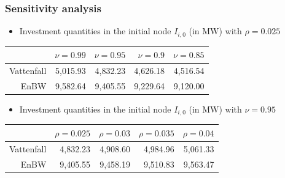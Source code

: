 \begin{frame}
  \frametitle{Sensitivity analysis}

  \begin{itemize}
  \item Investment quantities in the initial node $I_{i,0}$ (in MW) with $\rho=0.025$
  \end{itemize}

\begin{center}
  \begin{tabular}{rrrrr}
\hline
           &       $\nu=0.99$ &       $\nu=0.95$ &        $\nu=0.9$ &       $\nu=0.85$ \\
\hline\hline
 Vattenfall  &      5,015.93  &      4,832.23  &      4,626.18  &      4,516.54  \\

     EnBW  &      9,582.64  &      9,405.55  &      9,229.64  &      9,120.00  \\
\hline
\end{tabular}
\end{center}

\begin{itemize}
\item Investment quantities in the initial node $I_{i,0}$ (in MW) with $\nu=0.95$
\end{itemize}

\begin{center}
  \begin{tabular}{rrrrr}
\hline
           &      $\rho=0.025$ &       $\rho=0.03$ &      $\rho=0.035$ &       $\rho=0.04$ \\
\hline\hline
Vattenfall &      4,832.23  &      4,908.60  &      4,984.96  &      5,061.33  \\

      EnBW &      9,405.55  &      9,458.19  &      9,510.83  &      9,563.47  \\
\hline
\end{tabular}  
\end{center}

\end{frame}